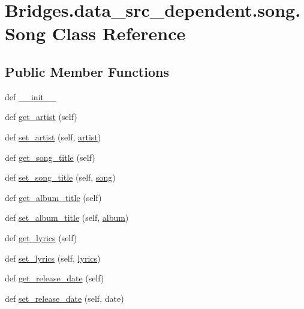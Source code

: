 \hypertarget{class_bridges_1_1data__src__dependent_1_1song_1_1_song}{}\section{Bridges.\+data\+\_\+src\+\_\+dependent.\+song.\+Song Class Reference}
\label{class_bridges_1_1data__src__dependent_1_1song_1_1_song}
\subsection*{Public Member Functions}
\begin{DoxyCompactItemize}
\item 
def \hyperlink{class_bridges_1_1data__src__dependent_1_1song_1_1_song_aa57f966cb8e17014f0ce5d89b56c2333}{\+\_\+\+\_\+init\+\_\+\+\_\+}
\item 
def \hyperlink{class_bridges_1_1data__src__dependent_1_1song_1_1_song_a14bd11833e654ffaa4fef4cbb2853664}{get\+\_\+artist} (self)
\item 
def \hyperlink{class_bridges_1_1data__src__dependent_1_1song_1_1_song_a5bedba1a235dd34d792523c4d77f5ff4}{set\+\_\+artist} (self, \hyperlink{class_bridges_1_1data__src__dependent_1_1song_1_1_song_ad409bafaa5e361ef6297ff50674695d6}{artist})
\item 
def \hyperlink{class_bridges_1_1data__src__dependent_1_1song_1_1_song_ac5a7649c20369fc725d785dff73efc59}{get\+\_\+song\+\_\+title} (self)
\item 
def \hyperlink{class_bridges_1_1data__src__dependent_1_1song_1_1_song_ac3395b5b74cd877e8ab5b8faa6afd575}{set\+\_\+song\+\_\+title} (self, \hyperlink{class_bridges_1_1data__src__dependent_1_1song_1_1_song_ac5a91e041afaa2dcc712ea4224d3fab7}{song})
\item 
def \hyperlink{class_bridges_1_1data__src__dependent_1_1song_1_1_song_a86e83e54342375ef611e0ed56bba9d36}{get\+\_\+album\+\_\+title} (self)
\item 
def \hyperlink{class_bridges_1_1data__src__dependent_1_1song_1_1_song_ac0f75bf28a60c013bb2feb30ce8a8749}{set\+\_\+album\+\_\+title} (self, \hyperlink{class_bridges_1_1data__src__dependent_1_1song_1_1_song_a6381d4ba7d271c97fe63dc1b0bde14ec}{album})
\item 
def \hyperlink{class_bridges_1_1data__src__dependent_1_1song_1_1_song_afdb5b39d18aadd2f4ffaa6bff9d20255}{get\+\_\+lyrics} (self)
\item 
def \hyperlink{class_bridges_1_1data__src__dependent_1_1song_1_1_song_ab8970f92d4e13dcfd29012798f4c47ac}{set\+\_\+lyrics} (self, \hyperlink{class_bridges_1_1data__src__dependent_1_1song_1_1_song_ae6ac66576fe91574af55fbe8267a684b}{lyrics})
\item 
def \hyperlink{class_bridges_1_1data__src__dependent_1_1song_1_1_song_a7037303cf1583c8a602c7a7284f5771f}{get\+\_\+release\+\_\+date} (self)
\item 
def \hyperlink{class_bridges_1_1data__src__dependent_1_1song_1_1_song_a3975a7dca3d5423f63b6a358794050eb}{set\+\_\+release\+\_\+date} (self, date)
\end{DoxyCompactItemize}
